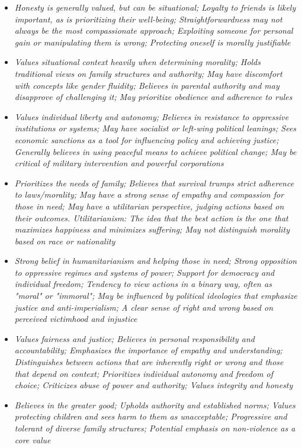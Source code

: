 \documentclass[11pt]{article}
\newcommand{\profiletext}[1]{\textit{#1}}
\begin{document}
\begin{itemize}
\item \profiletext{Honesty is generally valued, but can be situational; Loyalty to friends is likely important, as is prioritizing their well-being; Straightforwardness may not always be the most compassionate approach; Exploiting someone for personal gain or manipulating them is wrong; Protecting oneself is morally justifiable}
\item \profiletext{Values situational context heavily when determining morality; Holds traditional views on family structures and authority; May have discomfort with concepts like gender fluidity; Believes in parental authority and may disapprove of challenging it; May prioritize obedience and adherence to rules}
\item \profiletext{Values individual liberty and autonomy; Believes in resistance to oppressive institutions or systems; May have socialist or left-wing political leanings; Sees economic sanctions as a tool for influencing policy and achieving justice; Generally believes in using peaceful means to achieve political change; May be critical of military intervention and powerful corporations}
\item \profiletext{Prioritizes the needs of family; Believes that survival trumps strict adherence to laws/morality; May have a strong sense of empathy and compassion for those in need; May have a utilitarian perspective, judging actions based on their outcomes. Utilitarianism: The idea that the best action is the one that maximizes happiness and minimizes suffering; May not distinguish morality based on race or nationality}
\item \profiletext{Strong belief in humanitarianism and helping those in need; Strong opposition to oppressive regimes and systems of power; Support for democracy and individual freedom; Tendency to view actions in a binary way, often as "moral" or "immoral"; May be influenced by political ideologies that emphasize justice and anti-imperialism; A clear sense of right and wrong based on perceived victimhood and injustice}
\item \profiletext{Values fairness and justice; Believes in personal responsibility and accountability; Emphasizes the importance of empathy and understanding; Distinguishes between actions that are inherently right or wrong and those that depend on context; Prioritizes individual autonomy and freedom of choice; Criticizes abuse of power and authority; Values integrity and honesty}
\item \profiletext{Believes in the greater good; Upholds authority and established norms; Values protecting children and sees harm to them as unacceptable; Progressive and tolerant of diverse family structures; Potential emphasis on non-violence as a core value}

\end{itemize}
\end{document}
